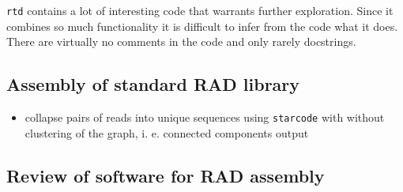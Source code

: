 \documentclass{article}\usepackage[]{graphicx}\usepackage[]{color}
\begin{document}
\texttt{rtd} contains a lot of interesting code that warrants further exploration. Since it combines so much functionality it is difficult to infer from the code what it does. There are virtually no comments in the code and only rarely docstrings.

\subsection{Assembly of standard RAD library}

\begin{itemize}
\item collapse pairs of reads into unique sequences using \texttt{starcode} with without clustering of the graph, i. e. connected components output
\end{itemize}

\clearpage

\subsection{Review of software for RAD assembly}
\end{document}
